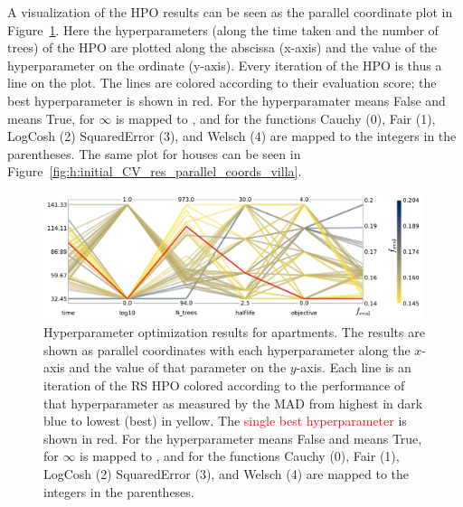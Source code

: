 A visualization of the HPO results can be seen as the parallel coordinate plot in Figure~\ref{fig:h:initial_CV_res_parallel_coords_ejer}. Here the hyperparameters (along the time taken and the number of trees) of the HPO are plotted along the abscissa (x-axis) and the value of the hyperparameter on the ordinate (y-axis). Every iteration of the HPO is thus a line on the plot. The lines are colored according to their evaluation score; the best hyperparameter is shown in red. For the hyperparamater   means False and  means True, for  $\infty$ is mapped to , and for  the functions Cauchy (0), Fair (1), LogCosh (2) SquaredError (3), and Welsch (4) are mapped to the integers in the parentheses. The same plot for houses can be seen in Figure~\ref{fig:h:initial_CV_res_parallel_coords_villa}.

\begin{figure}
  \centerfloat
  \includegraphics[width=0.99\textwidth, trim=0 0 0 0, clip]{figures/housing/Ejerlejlighed_v19_cut_all_Ncols_all_CV_viz_initial_HPO.pdf}
  \caption[Parallel Coordinate Plot of the Initial Hyperparameter Optimization for Apartments]
          {Hyperparameter optimization results for apartments. The results are shown as parallel coordinates with each hyperparameter along the $x$-axis and the value of that parameter on the $y$-axis. Each line is an iteration of the RS HPO colored according to the performance of that hyperparameter as measured by the MAD from \textcolor{viridis-dark}{highest} in dark blue to \textcolor{viridis-light}{lowest (best)} in yellow. The \textcolor{red}{single best hyperparameter} is shown in red. For the hyperparameter   means False and  means True, for  $\infty$ is mapped to , and for  the functions Cauchy (0), Fair (1), LogCosh (2) SquaredError (3), and Welsch (4) are mapped to the integers in the parentheses.
          } 
  \label{fig:h:initial_CV_res_parallel_coords_ejer}
\end{figure}

